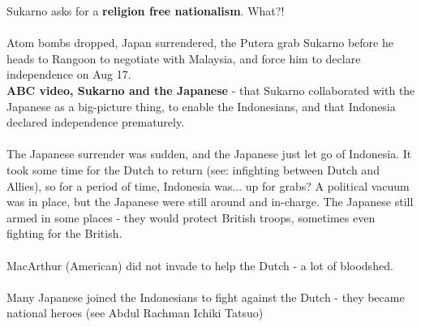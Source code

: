 \documentclass[a4paper]{article}
\begin{document}
\noindent Sukarno asks for a \textbf{religion free nationalism}. What?!\\
\\
Atom bombs dropped, Japan surrendered, the Putera grab Sukarno before he heads to Rangoon to negotiate with Malaysia, and force him to declare independence on Aug 17.\\
\textbf{ABC video, Sukarno and the Japanese} - that Sukarno collaborated with the Japanese as a big-picture thing, to enable the Indonesians, and that Indonesia declared independence prematurely.\\
\\
The Japanese surrender was sudden, and the Japanese just let go of Indonesia. It took some time for the Dutch to return (see: infighting between Dutch and Allies), so for a period of time, Indonesia was... up for grabs? A political vacuum was in place, but the Japanese were still around and in-charge. The Japanese still armed in some places - they would protect British troops, sometimes even fighting for the British.\\
\\
MacArthur (American) did not invade to help the Dutch - a lot of bloodshed.\\
\\
Many Japanese joined the Indonesians to fight against the Dutch - they became national heroes (see Abdul Rachman Ichiki Tatsuo)
\end{document}
